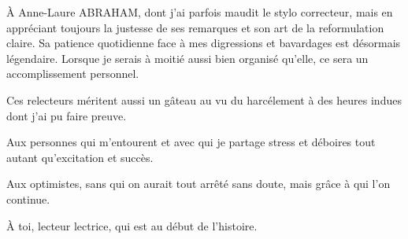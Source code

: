 \begin{footnotesize}
À Anne-Laure ABRAHAM, dont j'ai parfois maudit le stylo correcteur, mais en appréciant toujours la justesse de ses remarques et son art de la reformulation claire. Sa patience quotidienne face à mes digressions et bavardages est désormais légendaire.  Lorsque je serais à moitié aussi bien organisé qu'elle, ce sera un accomplissement personnel.

Ces relecteurs méritent aussi un gâteau au vu du harcélement à des heures indues dont j'ai pu faire preuve.

Aux personnes qui m'entourent et avec qui je partage stress et déboires tout autant qu'excitation et succès.

Aux optimistes, sans qui on aurait tout arrêté sans doute, mais grâce à qui l'on continue.

À toi, lecteur lectrice, qui est au début de l'histoire.
\end{footnotesize}
